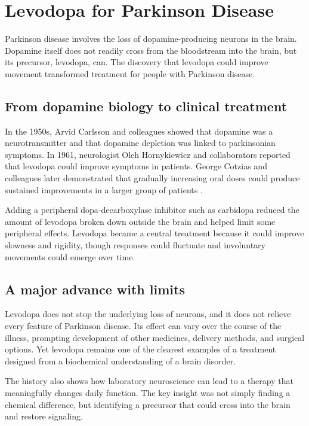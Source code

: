 \documentclass[12pt,oneside]{book}
\begin{document}
\chapter[Levodopa for Parkinson Disease]{Levodopa for Parkinson Disease}

Parkinson disease involves the loss of dopamine-producing neurons in the
brain. Dopamine itself does not readily cross from the bloodstream into the
brain, but its precursor, levodopa, can. The discovery that levodopa could
improve movement transformed treatment for people with Parkinson disease.

\section{From dopamine biology to clinical treatment}
In the 1950s, Arvid Carlsson and colleagues showed that dopamine was a neurotransmitter and that dopamine depletion was linked to parkinsonian symptoms. In 1961, neurologist Oleh Hornykiewicz and collaborators reported that levodopa could improve symptoms in patients. George Cotzias and colleagues later demonstrated that gradually increasing oral doses could produce sustained improvements in a larger group of patients \cite{levodopaHistory,cotziasLevodopa}.

Adding a peripheral dopa-decarboxylase inhibitor such as carbidopa reduced the
amount of levodopa broken down outside the brain and helped limit some
peripheral effects. Levodopa became a central treatment because it could
improve slowness and rigidity, though responses could fluctuate and
involuntary movements could emerge over time.

\section{A major advance with limits}
Levodopa does not stop the underlying loss of neurons, and it does not relieve every feature of Parkinson disease. Its effect can vary over the course of the illness, prompting development of other medicines, delivery methods, and surgical options. Yet levodopa remains one of the clearest examples of a treatment designed from a biochemical understanding of a brain disorder.

The history also shows how laboratory neuroscience can lead to a therapy that
meaningfully changes daily function. The key insight was not simply finding a
chemical difference, but identifying a precursor that could cross into the
brain and restore signaling.
\end{document}
